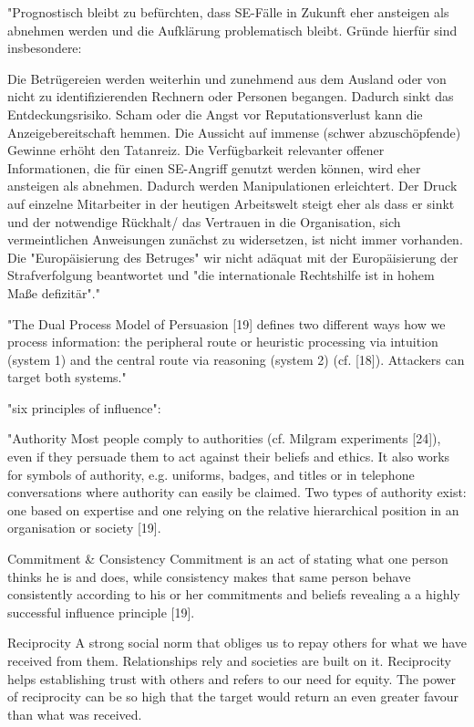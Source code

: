 "Prognostisch bleibt zu befürchten, dass SE-Fälle in Zukunft eher ansteigen als abnehmen
werden und die Aufklärung problematisch bleibt. Gründe hierfür sind insbesondere:

 Die Betrügereien werden weiterhin und zunehmend aus dem Ausland oder von nicht
zu identifizierenden Rechnern oder Personen begangen. Dadurch sinkt das Entdeckungsrisiko.
 Scham oder die Angst vor Reputationsverlust kann die Anzeigebereitschaft hemmen.
 Die Aussicht auf immense (schwer abzuschöpfende) Gewinne erhöht den Tatanreiz.
 Die Verfügbarkeit relevanter offener Informationen, die für einen SE-Angriff genutzt
werden können, wird eher ansteigen als abnehmen. Dadurch werden Manipulationen
erleichtert.
 Der Druck auf einzelne Mitarbeiter in der heutigen Arbeitswelt steigt eher als dass er
sinkt und der notwendige Rückhalt/ das Vertrauen in die Organisation, sich vermeintlichen Anweisungen zunächst zu widersetzen, ist nicht immer vorhanden.
 Die "Europäisierung des Betruges" wir nicht adäquat mit der Europäisierung der
Strafverfolgung beantwortet und "die internationale Rechtshilfe ist in hohem Maße defizitär"."\cite{10_bka}

"The Dual Process Model of Persuasion [19] defines two different ways how we process information: the peripheral route or heuristic processing via intuition
(system 1) and the central route via reasoning (system 2) (cf. [18]). Attackers can target both systems."\cite{7_mdpi}

"six principles of influence":\cite{7_mdpi}

"Authority
Most people comply to authorities (cf. Milgram experiments [24]), even if they persuade them to act against their beliefs and ethics. It also works for symbols of authority, e.g. uniforms, badges, and titles or in telephone conversations where authority can easily be claimed. Two types of authority exist: one based on expertise and one relying on the relative hierarchical position in an organisation or society [19].

Commitment \& Consistency
Commitment is an act of stating what one person thinks he is and does, while consistency makes that same person behave consistently according to his or her commitments and beliefs revealing a a highly successful influence principle [19].

Reciprocity
A strong social norm that obliges us to repay others for what we have received from them. Relationships rely and societies are built on it. Reciprocity helps establishing trust with others and refers to our need for equity. The power of reciprocity can be so high that the target would return an even greater favour than what was received.

